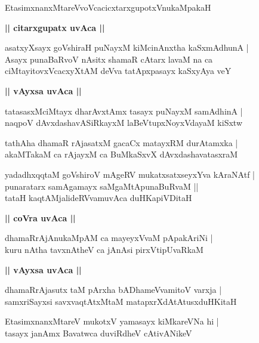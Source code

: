\documentclass[twoside,12pt,openright]{book}
\newcounter{shloka}[chapter]
\def\uvaca#1{\centerline{{\large\textbf{#1}}}}
\begin{document}
\begin{shloka}%
EtasimxnanxMtareVvoVcacicxtarxgupotxVnukaMpakaH 
\end{shloka}

\uvaca{|| citarxgupatx uvAca ||}

\begin{shloka}%
asatxyXsayx goVshiraH puNayxM kiMcinAnxtha kaSxmAdhunA |\\
Asayx punaBaRvoV nAsitx shamaR cAtarx lavaM na ca \\
ciMtayitovxVcacxyXtAM deVva tatApxpasayx kaSxyAya veY
\end{shloka}

\uvaca{|| vAyxsa uvAca ||}

\begin{shloka}%
tatasasxMciMtayx dharAvxtAmx tasayx puNayxM samAdhinA |\\
naqpoV dAvxdashavASiRkayxM laBeVtupxNoyxVdayaM kiSxtw 
\end{shloka}

\begin{shloka}%
tathAha dhamaR rAjasatxM gacaCx matayxRM durAtamxka |\\
akaMTakaM ca rAjayxM ca BuMkaSxvX dAvxdashavatasxraM
\end{shloka}

\begin{shloka}%
yadadhxqqtaM goVshiroV mAgeRV mukatxsatxseyxYva kAraNAtf |\\
punaratarx samAgamayx saMgaMtApunaBuRvaM ||\\
tataH kaqtAMjalideRVvamuvAca duHKapiVDitaH
\end{shloka}

\uvaca{|| coVra uvAca ||}

\begin{shloka}%
dhamaRrAjAnukaMpAM ca mayeyxVvaM pApakAriNi |\\
kuru nAtha tavxnAtheV ca jAnAsi pirxVtipUvaRkaM
\end{shloka}

\uvaca{|| vAyxsa uvAca ||}

\begin{shloka}%
dhamaRrAjasutx taM pArxha bADhameVvamitoV varxja |\\
samxriSayxsi savxvaqtAtxMtaM matapxrXdAtAtusxduHKitaH 
\end{shloka}

\begin{shloka}%
EtasimxnanxMtareV mukotxV yamasayx kiMkareVNa hi |\\
tasayx janAmx Bavatwca duviRdheV cAtivANikeV 
\end{shloka}
\end{document}
